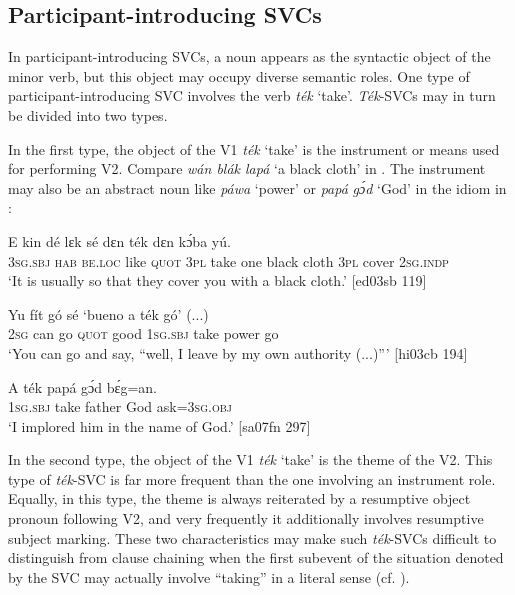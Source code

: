 \subsection{Participant-introducing SVCs}\label{sec:11.2.3}

In participant-introducing SVCs, a noun appears as the syntactic object of the minor verb, but this object may occupy diverse semantic roles. One type of participant-introducing SVC involves the verb \textit{ték} ‘take’. \textit{Ték}{}-SVCs may in turn be divided into two types. 


In the first type, the object of the V1 \textit{ték} ‘take’ is the instrument\index{} or means used for performing V2. Compare \textit{wán blák lapá} ‘a black cloth’ in . The instrument may also be an abstract noun like \textit{páwa} ‘power’  or \textit{papá} \textit{gɔ́d} ‘God’ in the idiom in :



\ea%
    \label{ex:key:1561}
    \gll E    kin  dé    lɛk  sé    dɛn  ték           dɛn  kɔ́ba  yú.\\
\textsc{3sg.sbj}  \textsc{hab}  \textsc{be.loc}  like  \textsc{quot}    \textsc{3pl}  take  one  black  cloth  \textsc{3pl}  cover  \textsc{2sg.indp}\\

\glt ‘It is usually so that they cover you with a black cloth.’ [ed03sb 119]
\z


\ea%
    \label{ex:key:1562}
    \gll Yu  fít  gó  sé    ‘bueno  a    ték      gó’  (...)\\
\textsc{2sg}  can  go  \textsc{quot}    good  \textsc{1sg.sbj}  take    power  go\\

\glt ‘You can go and say, “well, I leave by my own authority (...)”’ [hi03cb 194]
\z


\ea%
    \label{ex:key:1563}
    \gll A    ték    papá  gɔ́d  bɛ́g=an.\\
\textsc{1sg.sbj}  take    father  God  ask=\textsc{3sg.obj}\\

\glt ‘I implored him in the name of God.’ [sa07fn 297]
\z

In the second type, the object of the V1 \textit{ték} ‘take’ is the theme of the V2. This type of \textit{ték}{}-SVC is far more frequent than the one involving an instrument role. Equally, in this type, the theme is always reiterated by a resumptive object pronoun following V2, and very frequently it additionally involves resumptive subject marking. These two characteristics may make such \textit{ték}{}-SVCs difficult to distinguish from clause chaining when the first subevent of the situation denoted by the SVC may actually involve “taking” in a literal sense (cf. ).


